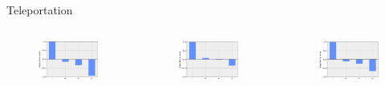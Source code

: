\begin{frame}{Teleportation}
\begin{columns}
\begin{figure}
\includegraphics[width=1\linewidth]{images/results/tele_pauli_sim.png}
\end{figure}
\begin{figure}
	\includegraphics[width=1\linewidth]{images/results/tele_pauli_dev.png}
\end{figure}	
\begin{figure}
	\includegraphics[width=1\linewidth]{images/results/tele_pauli_cal.png}

\end{figure}
\end{columns}
\end{frame}
